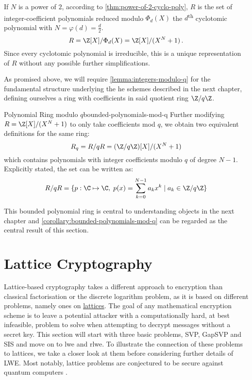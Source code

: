 If $N$ is a power of $2$, according to \autoref{thm:power-of-2-cyclo-poly},
$R$ is the set of integer-coefficient polynomials reduced modulo $\Phi_d(X)$
the $d$\textsuperscript{th} cyclotomic polynomial with $N = \varphi(d) = \frac{d}{2}$.
$$R = \Z[X] / \Phi_d(X) = \Z[X] / (X^N + 1)\,.$$
Since every cyclotomic polynomial is irreducible, this is a unique representation of $R$
without any possible further simplifications.

As promised above, we will require \autoref{lemma:integers-modulo-q} for the fundamental structure underlying the \gls{he} schemes described in the next chapter, defining ourselves a ring with coefficients in said quotient ring $\Z/q\Z$.

\begin{corollary}{Polynomial Ring modulo $q$}{bounded-polynomials-mod-q}
  Further modifying $R = \Z[X] / (X^N+1)$ to only take coefficients mod $q$, we obtain two equivalent definitions for the same ring:
  $$R_q = R/qR = (\Z/q\Z)[X] / (X^N+1)$$
  which contains polynomials with integer coefficients modulo $q$ of degree $N-1$.
  Explicitly stated, the set can be written as:
  $$R/qR = \{p: \C \mapsto \C,\; p(x) = \sum_{k=0}^{N-1} a_k x^k \;|\; a_k \in \Z/q\Z\}$$
\end{corollary}

This bounded polynomial ring is central to understanding objects in the next chapter and \autoref{corollary:bounded-polynomials-mod-q} can be regarded as the central result of this section.

\pagebreak
\section{Lattice Cryptography}
\label{subsec:lattice-crypto}
Lattice-based cryptography takes a different approach to encryption than classical factorisation or the discrete logarithm problem, as it is based on different problems, namely ones on \hyperref[def:lattice]{lattices}.
The goal of any mathematical encryption scheme is to leave a potential attacker with a computationally hard, at best infeasible, problem to solve when attempting to decrypt messages without a secret key.
This section will start with three basic problems, SVP, GapSVP and SIS and move on to \gls{lwe} and \gls{rlwe}.
To illustrate the connection of these problems to lattices, we take a closer look at them before considering further details of LWE.
Most notably, lattice problems are conjectured to be secure against quantum computers \parencite{2018-lattice-problems}.

